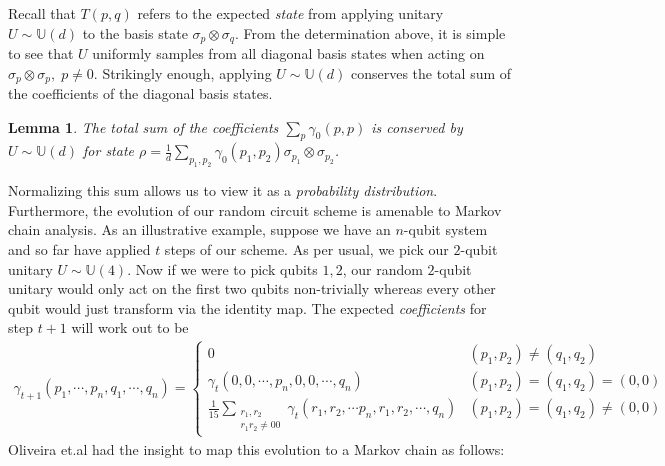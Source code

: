\documentclass[12pt]{amsart}
\newtheorem{lemma}[theorem]{Lemma}
\theoremstyle{definition}
\theoremstyle{remark}
\numberwithin{equation}{section}
\theoremstyle{remark}
\begin{document}
%
Recall that $T(p,q)$ refers to the expected \emph{state} from applying unitary $U \sim \mathbb{U}(d)$ to the basis state $\sigma_p \otimes \sigma_q$. From the determination above, it is simple to see that $U$ uniformly samples from all diagonal basis states when acting on $\sigma_p \otimes \sigma_p, \; p \neq 0$. Strikingly enough, applying $U \sim \mathbb{U}(d)$ conserves the total sum of the coefficients of the diagonal basis states.
%
\begin{lemma}
  The total sum of the coefficients $\sum_{p} \gamma_0(p,p)$ is conserved by $U \sim \mathbb{U}(d)$ for state $\rho = \frac{1}{d}\sum_{p_1,p_2} \gamma_0(p_1,p_2) \sigma_{p_1} \otimes \sigma_{p_2}$.
\end{lemma}
%
Normalizing this sum allows us to view it as a \emph{probability distribution}. Furthermore, the evolution of our random circuit scheme is amenable to Markov chain analysis. As an illustrative example, suppose we have an $n$-qubit system and so far have applied $t$ steps of our scheme. As per usual, we pick our $2$-qubit unitary $U \sim \mathbb{U}(4)$. Now if we were to pick qubits $1,2$, our random $2$-qubit unitary would only act on the first two qubits non-trivially whereas every other qubit would just transform via the identity map. The expected \emph{coefficients} for step $t+1$ will work out to be
%
\begin{align}
    \gamma_{t+1}(p_1,\cdots,p_n,q_1,\cdots,q_n) = \begin{cases}
       0 & (p_1 ,p_2) \neq (q_1, q_2) \\
       \gamma_t(0,0,\cdots, p_n, 0,0,\cdots,q_n ) & (p_1,p_2) = (q_1, q_2) = (0,0) \\
       \frac{1}{15}\sum_{\substack{r_1,r_2 \\ r_1r_2 \neq 00}} \gamma_t(r_1,r_2,\cdots p_n,r_1,r_2,\cdots,q_n) & (p_1,p_2) = (q_1,q_2) \neq (0,0)
    \end{cases}
\end{align}
 Oliveira et.al \cite{oliveira} had the insight to map this evolution to a Markov chain as follows: \newline
%
\end{document}
